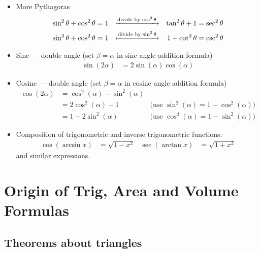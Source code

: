 \begin{itemize}
 \item More Pythagoras
\begin{align*}
\sin^2\theta + \cos^2 \theta &=1 & \xmapsto{\text{divide by $\cos^2\theta$}}&&
\tan^2\theta + 1  &= \sec^2\theta \\
\sin^2\theta + \cos^2 \theta &=1 & \xmapsto{\text{divide by $\sin^2\theta$}}&&
1 + \cot^2 \theta &=\csc^2\theta
\end{align*}

 \item Sine --- double angle (set $\beta =\alpha$ in sine angle addition formula)
\begin{align*}
  \sin(2\alpha) &= 2\sin(\alpha)\cos(\alpha)
\end{align*}
 \item Cosine --- double angle (set $\beta =\alpha$ in cosine angle addition formula)
\begin{align*}
  \cos(2\alpha) &= \cos^2(\alpha) - \sin^2(\alpha) \\
  &= 2\cos^2(\alpha) - 1  & \text{(use $\sin^2(\alpha)= 1-\cos^2(\alpha)$)}\\
  &= 1 - 2\sin^2(\alpha) & \text{(use $\cos^2(\alpha)= 1-\sin^2(\alpha)$)}
\end{align*}
\item Composition of trigonometric and inverse trigonometric functions:
\begin{align*}
  \cos( \arcsin x) &= \sqrt{1-x^2} &
  \sec( \arctan x) &= \sqrt{1+x^2}
\end{align*}
and similar expressions.
\end{itemize}

\chapter{Origin of Trig, Area and Volume Formulas}
\section{Theorems about triangles}
